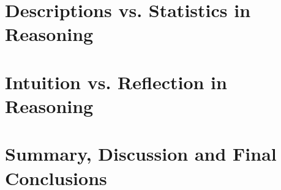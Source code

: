 \documentclass{Dissertate}
\begin{document}
\chapter{Descriptions vs. Statistics in Reasoning}
\graphicspath{{5.Baserate/}}








\chapter{Intuition vs. Reflection in Reasoning}
\graphicspath{{6.CRT/}}






\chapter{Summary, Discussion and Final Conclusions}
\graphicspath{{7.Conclusions/}}







\clearpage
{\small}

\let\cleardoublepage\clearpage
{}

\end{document}
